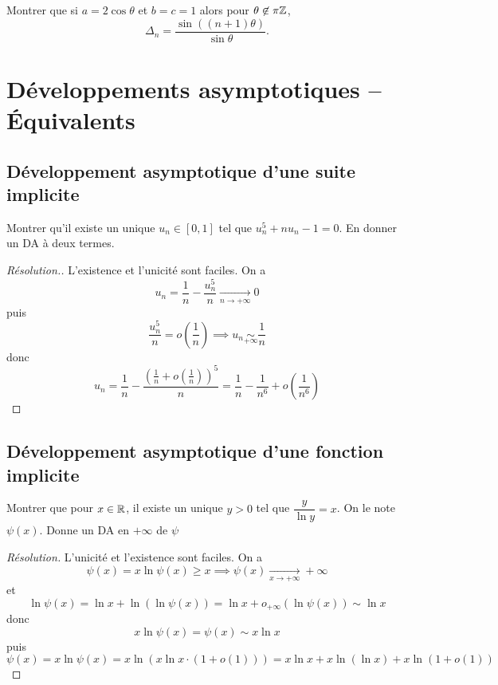 \begin{exo}
    Montrer que si $a=2\cos\theta$ et $b=c=1$ alors pour $\theta\not\in\pi\mathbb Z$, \[
        \Delta_n=\frac{\sin((n+1)\theta)}{\sin\theta}.
    \]
\end{exo}

\section{Développements asymptotiques -- Équivalents}

\subsection{Développement asymptotique d'une suite implicite}

\begin{exo}
    Montrer qu'il existe un unique $u_n\in[0, 1]$ tel que $u_n^5+nu_n-1=0$. En donner un DA à deux termes.
\end{exo}

\begin{proof}[Résolution.]
    L'existence et l'unicité sont faciles. On a \[
        u_n=\frac1n-\frac{u_n^5}n\xrightarrow[n\to+\infty]{}0
    \]
    puis \[
        \frac{u_n^5}n=o \left( \frac1n \right)\implies u_n\underset{+\infty}\sim\frac1n
    \]
    donc \[
        u_n=\frac1n-\frac{ \left( \frac1n+o\left(\frac1n\right) \right)^5 }n=\frac1n-\frac1{n^6}+o \left( \frac1{n^6} \right)
    \]
\end{proof}

\subsection{Développement asymptotique d'une fonction implicite}

\begin{exo}
    Montrer que pour $x\in\mathbb R$, il existe un unique $y>0$ tel que $\dfrac y{\ln y}=x$. On le note $\psi(x)$. Donne un DA en $+\infty$ de $\psi$
\end{exo}

\begin{proof}[Résolution]
    L'unicité et l'existence sont faciles. On a \[
        \psi(x)=x\ln \psi(x) \geq x \implies \psi(x)\xrightarrow[x\to+\infty]{}+\infty
    \]
    et \[
        \ln\psi(x)=\ln x+\ln(\ln \psi(x))=\ln x+o_{+\infty}(\ln \psi(x))\sim \ln x
    \]
    donc \[
        x\ln \psi(x)=\psi(x)\sim x\ln x
    \]
    puis \[
        \psi(x)=x\ln\psi(x)=x\ln(x\ln x\cdot(1+o(1)))=x\ln x+x\ln(\ln x)+x\ln(1+o(1))
    \]
\end{proof}

